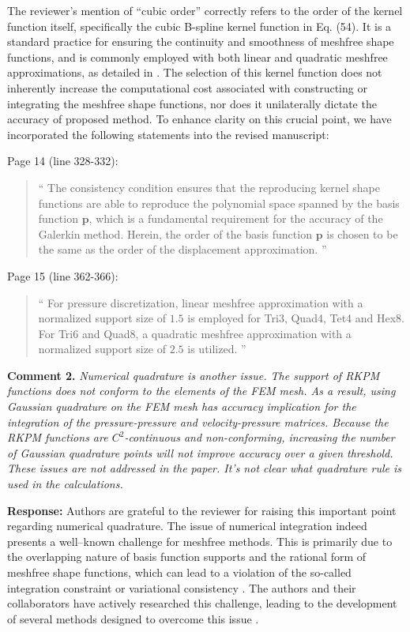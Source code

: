 \documentclass{article}
\begin{document}
The reviewer's mention of ``cubic order'' correctly refers to the order of the kernel function itself, specifically the cubic B-spline kernel function in Eq. (54).
It is a standard practice for ensuring the continuity and smoothness of meshfree shape functions, and is commonly employed with both linear and quadratic meshfree approximations, as detailed in \cite{belytschko1994}.
The selection of this kernel function does not inherently increase the computational cost associated with constructing or integrating the meshfree shape functions, nor does it unilaterally dictate the accuracy of proposed method.
To enhance clarity on this crucial point, we have incorporated the following statements into the revised manuscript:

Page 14 (line 328-332):
\begin{quote}``
The consistency condition ensures that the reproducing kernel shape functions are able to reproduce the polynomial space spanned by the basis function $\boldsymbol{p}$, which is a fundamental requirement for the accuracy of the Galerkin method.
Herein, the order of the basis function $\boldsymbol{p}$ is chosen to be the same as the order of the displacement approximation.
''\end{quote}

Page 15 (line 362-366):
\begin{quote}``
For pressure discretization, linear meshfree approximation with a normalized support size of $1.5$ is employed for Tri3, Quad4, Tet4 and Hex8.
For Tri6 and Quad8, a quadratic meshfree approximation with a normalized support size of $2.5$ is utilized.
''\end{quote}

\textbf{Comment 2.} \textit{Numerical quadrature is another issue. The support of RKPM functions does not conform to the elements of the FEM mesh. As a result, using Gaussian quadrature on the FEM mesh has accuracy implication for the integration of the pressure-pressure and velocity-pressure matrices. Because the RKPM functions are $C^2$-continuous and non-conforming, increasing the number of Gaussian quadrature points will not improve accuracy over a given threshold. These issues are not addressed in the paper. It's not clear what quadrature rule is used in the calculations.}

\textbf{Response:} Authors are grateful to the reviewer for raising this important point regarding numerical quadrature.
The issue of numerical integration indeed presents a well--known challenge for meshfree methods.
This is primarily due to the overlapping nature of basis function supports and the rational form of meshfree shape functions, which can lead to a violation of the so-called integration constraint or variational consistency \cite{chen2001,wu2021}.
The authors and their collaborators have actively researched this challenge, leading to the development of several methods designed to overcome this issue \cite{wang2016a,wang2019}.
\end{document}
